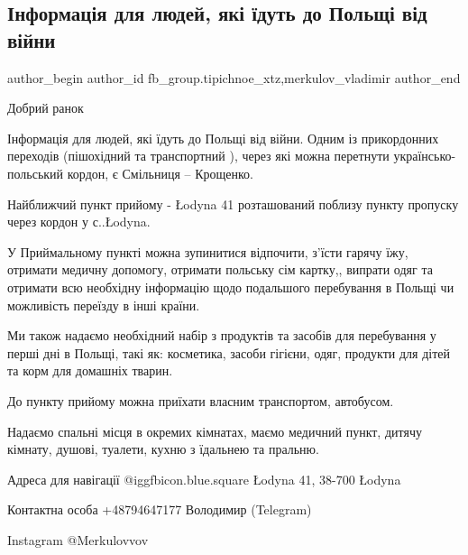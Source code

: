  
 
 
 
 
 
\subsection{Інформація для людей, які їдуть до Польщі від війни}
\label{sec:13_05_2022.fb.fb_group.tipichnoe_xtz.1.info_dlja_ludei_v_polshu}
 
\ifcmt
 author_begin
   author_id fb_group.tipichnoe_xtz,merkulov_vladimir
 author_end
\fi

Добрий ранок

Інформація для людей, які їдуть до Польщі від війни.  Одним із прикордонних
переходів (пішохідний та транспортний ), через які можна перетнути
українсько-польський кордон, є Смільниця – Крощенко. 

Найближчий пункт прийому - Łodyna 41 розташований поблизу пункту пропуску через
кордон у с..Łodyna.


У Приймальному пункті можна зупинитися відпочити, з'їсти  гарячу їжу, отримати
медичну допомогу, отримати польську сім картку,, випрати одяг та отримати всю
необхідну інформацію щодо подальшого перебування в Польщі чи можливість
переїзду в інші країни. 

Ми також надаємо необхідний набір з продуктів та засобів для перебування у
перші дні в Польщі, такі як: косметика, засоби гігієни, одяг, продукти для
дітей та корм для домашніх тварин.


До пункту прийому можна приїхати власним транспортом, автобусом.

Надаємо спальні місця в окремих кімнатах, маємо медичний пункт, дитячу кімнату,
душові, туалети, кухню з їдальнею та пральню.

Адреса для навігації  @igg{fbicon.blue.square}  Łodyna 41, 38-700 Łodyna

Контактна особа +48794647177 Володимир (Telegram) 

Instagram @Merkulovvov


